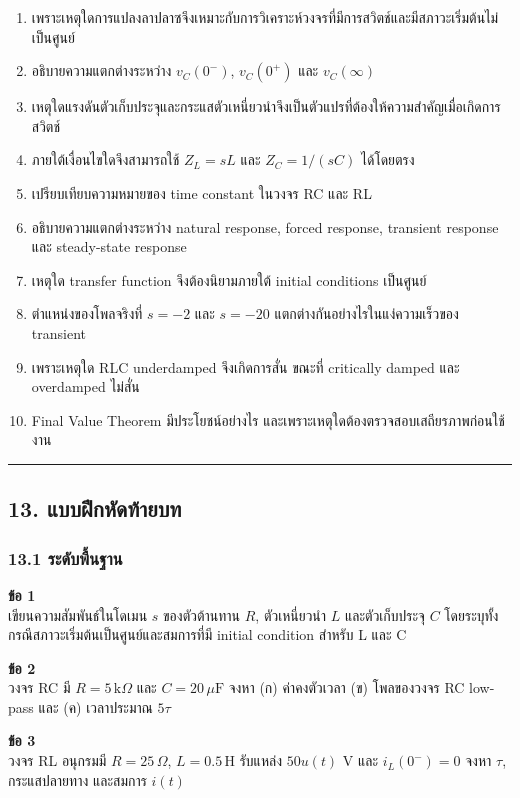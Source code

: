 \begin{enumerate}
    \item เพราะเหตุใดการแปลงลาปลาซจึงเหมาะกับการวิเคราะห์วงจรที่มีการสวิตช์และมีสภาวะเริ่มต้นไม่เป็นศูนย์
    \item อธิบายความแตกต่างระหว่าง $v_C(0^-)$, $v_C(0^+)$ และ $v_C(\infty)$
    \item เหตุใดแรงดันตัวเก็บประจุและกระแสตัวเหนี่ยวนำจึงเป็นตัวแปรที่ต้องให้ความสำคัญเมื่อเกิดการสวิตช์
    \item ภายใต้เงื่อนไขใดจึงสามารถใช้ $Z_L=sL$ และ $Z_C=1/(sC)$ ได้โดยตรง
    \item เปรียบเทียบความหมายของ time constant ในวงจร RC และ RL
    \item อธิบายความแตกต่างระหว่าง natural response, forced response, transient response และ steady-state response
    \item เหตุใด transfer function จึงต้องนิยามภายใต้ initial conditions เป็นศูนย์
    \item ตำแหน่งของโพลจริงที่ $s=-2$ และ $s=-20$ แตกต่างกันอย่างไรในแง่ความเร็วของ transient
    \item เพราะเหตุใด RLC underdamped จึงเกิดการสั่น ขณะที่ critically damped และ overdamped ไม่สั่น
    \item Final Value Theorem มีประโยชน์อย่างไร และเพราะเหตุใดต้องตรวจสอบเสถียรภาพก่อนใช้งาน
\end{enumerate}

\par\noindent\rule{\textwidth}{0.4pt}\par

\subsection{13. แบบฝึกหัดท้ายบท}

\subsubsection{13.1 ระดับพื้นฐาน}

\textbf{ข้อ 1}\\
เขียนความสัมพันธ์ในโดเมน $s$ ของตัวต้านทาน $R$, ตัวเหนี่ยวนำ $L$ และตัวเก็บประจุ $C$ โดยระบุทั้งกรณีสภาวะเริ่มต้นเป็นศูนย์และสมการที่มี initial condition สำหรับ L และ C

\textbf{ข้อ 2}\\
วงจร RC มี $R=5\,\text{k}\Omega$ และ $C=20\,\mu\text{F}$ จงหา (ก) ค่าคงตัวเวลา (ข) โพลของวงจร RC low-pass และ (ค) เวลาประมาณ $5\tau$

\textbf{ข้อ 3}\\
วงจร RL อนุกรมมี $R=25\,\Omega$, $L=0.5\,\text{H}$ รับแหล่ง $50u(t)$ V และ $i_L(0^-)=0$ จงหา $\tau$, กระแสปลายทาง และสมการ $i(t)$

